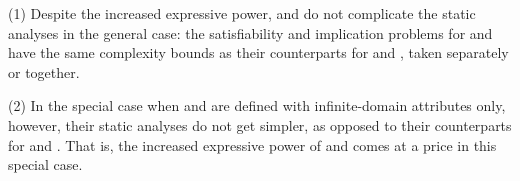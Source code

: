 \sstab
(1) Despite the increased expressive
power, \pCFDs and \pCINDs do not complicate the static analyses in the general case: the
satisfiability and implication problems for \pCFDs and \pCINDs have
the same complexity bounds as their
counterparts for \CFDs and \CINDs, taken separately or together.

\sstab
(2) In the special case when \pCFDs and \pCINDs are defined
with infinite-domain attributes only, however, their
static analyses do not get simpler, as opposed to their counterparts for
\CFDs and \CINDs. That is, the increased expressive power of \pCFDs and \pCINDs comes at a price in this special case.
